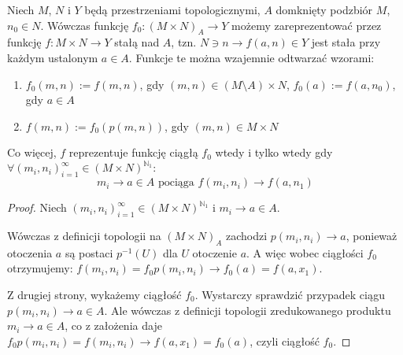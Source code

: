 \begin{prop}
  Niech $M$, $N$ i $Y$ będą przestrzeniami topologicznymi, $A$ domknięty podzbiór $M$, $n_0 \in N$. Wówczas funkcję $f_0: (M \times N)_A \rightarrow Y$ możemy zareprezentować przez funkcję $f: M \times N \rightarrow Y$ stałą nad $A$, tzn. $N \ni n \rightarrow f(a, n) \in Y$ jest stała przy każdym ustalonym $a \in A$. Funkcje te można wzajemnie odtwarzać wzorami:
  \begin{enumerate}
   \item $f_0(m,n) := f(m,n)$, gdy $(m,n) \in (M \setminus A) \times N$, $f_0(a) := f(a, n_0)$, gdy $a \in A$
   \item $f(m,n) := f_0(p(m,n))$, gdy $(m,n) \in M \times N$
  \end{enumerate}

  
  Co więcej, $f$ reprezentuje funkcję ciągłą $f_0$ wtedy i tylko wtedy gdy $\forall (m_i, n_i)_{i=1}^\infty \in (M \times N)^{\mathbb{N}_1}:$
  $$m_i \rightarrow a \in A \mbox{ pociąga } f(m_i, n_i) \rightarrow f(a, n_1)$$
  
  \begin{proof}
    Niech $(m_i, n_i)_{i=1}^\infty \in (M \times N)^{\mathbb{N}_1}$ i $m_i \rightarrow a \in A$.
    
    Wówczas z definicji topologii na $(M \times N)_A$ zachodzi $p(m_i, n_i) \rightarrow a$, ponieważ otoczenia $a$ są postaci $p^{-1}(U)$ dla $U$ otoczenie $a$. A więc wobec ciągłości $f_0$ otrzymujemy: $f(m_i, n_i) = f_0 p(m_i, n_i) \rightarrow f_0(a) = f(a, x_1)$.
    
    Z drugiej strony, wykażemy ciągłość $f_0$. Wystarczy sprawdzić przypadek ciągu $p(m_i, n_i) \rightarrow a \in A$. Ale wówczas z definicji topologii zredukowanego produktu $m_i \rightarrow a \in A$, co z założenia daje $f_0 p(m_i, n_i) = f(m_i, n_i) \rightarrow f(a, x_1) = f_0(a)$, czyli ciągłość $f_0$.
  \end{proof}
\end{prop}

